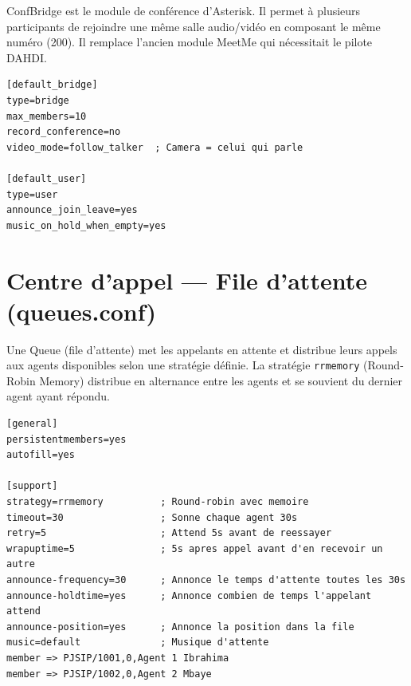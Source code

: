 \documentclass[a4paper,11pt]{report}
\begin{document}
\begin{infobox}
ConfBridge est le module de conférence d'Asterisk. Il permet à plusieurs participants de rejoindre une même salle audio/vidéo en composant le même numéro (200). Il remplace l'ancien module MeetMe qui nécessitait le pilote DAHDI.
\end{infobox}

\begin{codebox}
\begin{lstlisting}
[default_bridge]
type=bridge
max_members=10
record_conference=no
video_mode=follow_talker  ; Camera = celui qui parle

[default_user]
type=user
announce_join_leave=yes
music_on_hold_when_empty=yes
\end{lstlisting}
\end{codebox}

\section{Centre d'appel — File d'attente (queues.conf)}

\begin{infobox}
Une Queue (file d'attente) met les appelants en attente et distribue leurs appels aux agents disponibles selon une stratégie définie. La stratégie \texttt{rrmemory} (Round-Robin Memory) distribue en alternance entre les agents et se souvient du dernier agent ayant répondu.
\end{infobox}

\begin{codebox}
\begin{lstlisting}
[general]
persistentmembers=yes
autofill=yes

[support]
strategy=rrmemory          ; Round-robin avec memoire
timeout=30                 ; Sonne chaque agent 30s
retry=5                    ; Attend 5s avant de reessayer
wrapuptime=5               ; 5s apres appel avant d'en recevoir un autre
announce-frequency=30      ; Annonce le temps d'attente toutes les 30s
announce-holdtime=yes      ; Annonce combien de temps l'appelant attend
announce-position=yes      ; Annonce la position dans la file
music=default              ; Musique d'attente
member => PJSIP/1001,0,Agent 1 Ibrahima
member => PJSIP/1002,0,Agent 2 Mbaye
\end{lstlisting}
\end{codebox}
\end{document}
